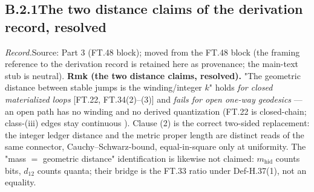 \documentclass[11pt,openany]{report}
\theoremstyle{canonplain}
\theoremstyle{canondef}
\begin{document}
\subsection*{\texorpdfstring{B.2.1\quad The two distance claims of the derivation record, resolved}{B.2.1 distance claims}}
{\small \textit{Record.}\quad Source: Part 3 (FT.48 block); moved from the FT.48 block (the framing reference to the derivation record is retained here as provenance; the main-text stub is neutral).}
\medskip
\textbf{Rmk (the two distance claims, resolved).} "The geometric distance between stable jumps is the winding/integer $k$" holds \textit{for closed materialized loops} [FT.22, FT.34(2)–(3)] and \textit{fails for open one-way geodesics} — an open path has no winding and no derived quantization (FT.22 is closed-chain; class-(iii) edges stay continuous ). Clause (2) is the correct two-sided replacement: the integer ledger distance and the metric proper length are distinct reads of the same connector, Cauchy–Schwarz-bound, equal-in-square only at uniformity. The "mass $=$ geometric distance" identification is likewise not claimed: $m_{\mathrm{hid}}$ counts bits, $d_{12}$ counts quanta; their bridge is the FT.33 ratio under Def-H.37(1), not an equality.

\medskip
\end{document}
